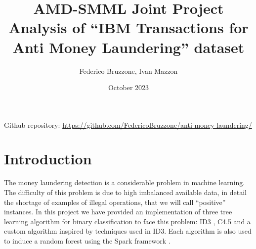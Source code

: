 \documentclass[12pt]{article}
\title{AMD-SMML Joint Project\\
\large Analysis of ``IBM Transactions for Anti Money Laundering'' dataset}
\author{Federico Bruzzone, Ivan Mazzon}
\date{October 2023}
\begin{document}
\vspace*{\fill}
\begin{minipage}{0.9\textwidth}
\maketitle
\end{minipage}
\vspace*{\fill}

{
\footnotesize
Github repository: \url{https://github.com/FedericoBruzzone/anti-money-laundering/}
}

\vspace{1cm}


\thispagestyle{empty}

\newpage
\thispagestyle{empty}
\setcounter{page}{0}

\onehalfspace
{
\tableofcontents
}

\newpage

\section{Introduction}

The money laundering detection is a considerable problem in machine learning.
The difficulty of this problem is due to high imbalanced available data, in detail the shortage of examples of illegal operations, that we will call ``positive'' instances.
In this project we have provided an implementation of three tree learning algorithm for binary classification to face this problem: ID3 \cite{ID3}, C4.5 \cite{C4.5} and a custom algorithm inspired by techniques used in ID3.
Each algorithm is also used to induce a random forest using the Spark framework \cite{SparkUrl}.
\end{document}
